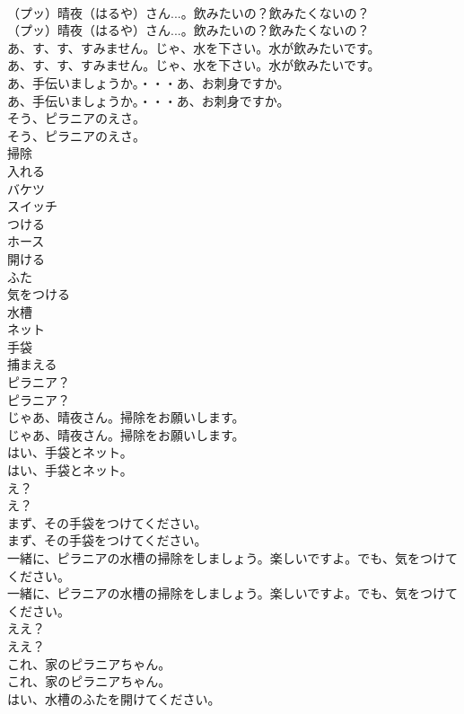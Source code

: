 \documentclass[8pt]{extreport}
\begin{document}
\begin{CJK}{UTF8}{min}
\\	（プッ）晴夜（はるや）さん...。飲みたいの？飲みたくないの？	
\\	（プッ）晴夜（はるや）さん...。飲みたいの？飲みたくないの？ 
\\	あ、す、す、すみません。じゃ、水を下さい。水が飲みたいです。	
\\	あ、す、す、すみません。じゃ、水を下さい。水が飲みたいです。 
\\	あ、手伝いましょうか。・・・あ、お刺身ですか。	
\\	あ、手伝いましょうか。・・・あ、お刺身ですか。 
\\	そう、ピラニアのえさ。	
\\	そう、ピラニアのえさ。 
\\	掃除
\\	入れる
\\	バケツ
\\	スイッチ
\\	つける
\\	ホース
\\	開ける
\\	ふた
\\	気をつける
\\	水槽
\\	ネット
\\	手袋
\\	捕まえる
\\	ピラニア？	
\\	ピラニア？ 
\\	じゃあ、晴夜さん。掃除をお願いします。	
\\	じゃあ、晴夜さん。掃除をお願いします。 
\\	はい、手袋とネット。	
\\	はい、手袋とネット。 
\\	え？	
\\	え？ 
\\	まず、その手袋をつけてください。	
\\	まず、その手袋をつけてください。 
\\	一緒に、ピラニアの水槽の掃除をしましょう。楽しいですよ。でも、気をつけてください。	
\\	一緒に、ピラニアの水槽の掃除をしましょう。楽しいですよ。でも、気をつけてください。 
\\	ええ？	
\\	ええ？ 
\\	これ、家のピラニアちゃん。	
\\	これ、家のピラニアちゃん。 
\\	はい、水槽のふたを開けてください。	

\end{CJK}
\end{document}
